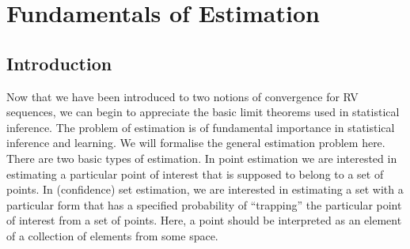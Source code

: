 \chapter{Fundamentals of Estimation}
\section{Introduction}
Now that we have been introduced to two notions of convergence for RV sequences, we can begin to appreciate the basic limit theorems used in statistical inference.  The problem of estimation is of fundamental importance in statistical inference and learning.  We will formalise the general estimation problem here.  There are two basic types of estimation.  In point estimation we are interested in estimating a particular point of interest that is supposed to belong to a set of points.  In (confidence) set estimation, we are interested in estimating a set with a particular form that has a specified probability of ``trapping'' the particular point of interest from a set of points.  Here, a point should be interpreted as an element of a collection of elements from some space.


